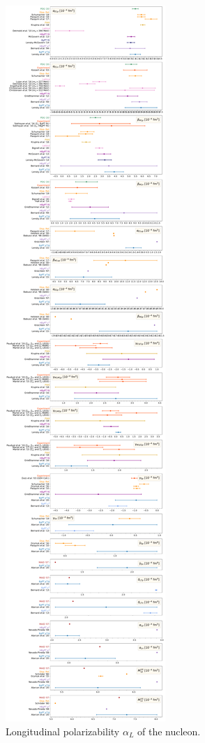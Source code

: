 \documentclass[preprints,review,accept,moreauthors,pdftex]{Definitions/mdpi}
\def\al{\alpha}
\begin{document}
\begin{figure}[t]
\centering
\includegraphics[viewport=0 402 1115 700,clip,width=\columnwidth]{Figures/AllPolarizabilities05.pdf}
\caption{Longitudinal polarizability $\al_{L}$ of the nucleon. \label{LongitudinalPolarizabilities}}
\end{figure} 
\end{document}
